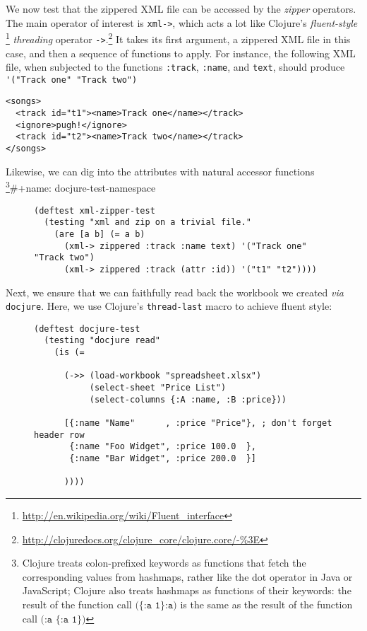 \documentclass[11pt]{article}
\begin{document}
We now test that the zippered XML file can be accessed by the \emph{zipper}
operators. The main operator of interest is \verb|xml->|, which acts
a lot like Clojure's
\emph{fluent-style} \footnote{\url{http://en.wikipedia.org/wiki/Fluent_interface}}
\emph{threading} operator
\verb|->|.\footnote{\url{http://clojuredocs.org/clojure_core/clojure.core/-\%3E}}
It takes its first argument, a zippered XML file in this case, and
then a sequence of functions to apply. For instance, the following
XML file, when subjected to the functions \verb|:track|,
\verb|:name|, and \verb|text|, should produce \verb|'("Track one" "Track two")|
\begin{verbatim}
<songs>
  <track id="t1"><name>Track one</name></track>
  <ignore>pugh!</ignore>
  <track id="t2"><name>Track two</name></track>
</songs>
\end{verbatim}
Likewise, we can dig into the attributes with natural accessor
functions \footnote{Clojure treats colon-prefixed keywords as functions that
fetch the corresponding values from hashmaps, rather like the dot
operator in Java or JavaScript; Clojure also treats hashmaps as
functions of their keywords: the result of the function call
$\texttt{(\{:a 1\} :a)}$ is the same as the result of the function call
$\texttt{(:a \{:a 1\})}$}\#+name: docjure-test-namespace

\begin{figure}[H]
\label{test-zippered}
\begin{verbatim}
(deftest xml-zipper-test
  (testing "xml and zip on a trivial file."
    (are [a b] (= a b)
      (xml-> zippered :track :name text) '("Track one" "Track two")
      (xml-> zippered :track (attr :id)) '("t1" "t2"))))
\end{verbatim}
\end{figure}

Next, we ensure that we can faithfully read back the workbook we
created \emph{via} \verb|docjure|. Here, we use Clojure's
\verb|thread-last| macro to achieve fluent style:
\begin{figure}[H]
\label{test-docjure-read}
\begin{verbatim}
(deftest docjure-test
  (testing "docjure read"
    (is (= 

      (->> (load-workbook "spreadsheet.xlsx")
           (select-sheet "Price List")
           (select-columns {:A :name, :B :price}))

      [{:name "Name"      , :price "Price"}, ; don't forget header row
       {:name "Foo Widget", :price 100.0  },
       {:name "Bar Widget", :price 200.0  }]

      ))))
\end{verbatim}
\end{figure}
\end{document}
